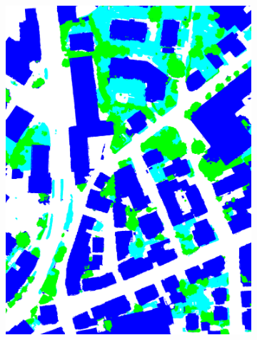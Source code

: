 \begin{figure}[htb]
\begin{subfigure}{0.19\textwidth}
  \includegraphics[width=1\linewidth]{fig/vai/1_anno.png}
\end{subfigure}
\begin{subfigure}{0.19\textwidth}
  \centering

\end{subfigure}
\end{figure}
